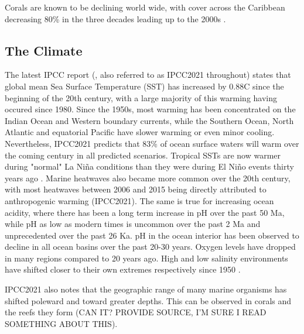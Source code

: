 \documentclass[11pt,a4paper]{article}
\begin{document}
Corals are known to be declining world wide, with cover across the Caribbean decreasing 80\% in the three decades leading up to the 2000s \citep{Gardner2003}.


\subsection{The Climate}
\label{Present Climate}

The latest IPCC report (\cite{IPCC2021WG1}, also referred to as IPCC2021 throughout) states that global mean Sea Surface Temperature (SST) has increased by 0.88\textdegree C since the beginning of the 20th century, with a large majority of this warming having occured since 1980. Since the 1950s, most warming has been concentrated on the Indian Ocean and Western boundary currents, while the Southern Ocean, North Atlantic and equatorial Pacific have slower warming or even minor cooling. Nevertheless, IPCC2021 predicts that 83\% of ocean surface waters will warm over the coming century in all predicted scenarios. Tropical SSTs are now warmer during "normal" La Ni\~{n}a conditions than they were during El Ni\~{n}o events thirty years ago \citep{Hughes2018a}. 
Marine heatwaves also became more common over the 20th century, with most heatwaves between 2006 and 2015 being directly attributed to anthropogenic warming (IPCC2021). 
The same is true for increasing ocean acidity, where there has been a long term increase in pH over the past 50 Ma, while pH as low as modern times is uncommon over the past 2 Ma and unprecedented over the past 26 Ka. pH in the ocean interior has been observed to decline in all ocean basins over the past 20-30 years. 
Oxygen levels have dropped in many regions compared to 20 years ago. High and low salinity environments have shifted closer to their own extremes respectively since 1950 \citep{IPCC2013TS}.

IPCC2021 also notes that the geographic range of many marine organisms has shifted poleward and toward greater depths. This can be observed in corals and the reefs they form (CAN IT? PROVIDE SOURCE, I'M SURE I READ SOMETHING ABOUT THIS).
\end{document}
